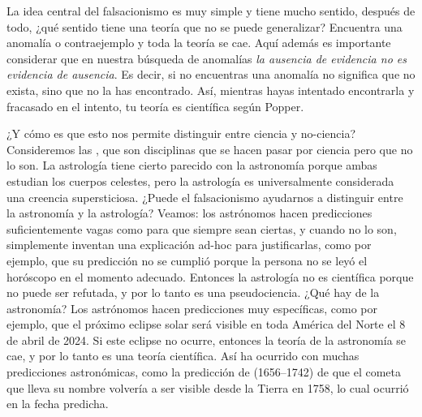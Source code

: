 La idea central del falsacionismo es muy simple y tiene mucho sentido,
después de todo, ¿qué sentido tiene una teoría que no se puede generalizar?
Encuentra una anomalía o contraejemplo y toda la teoría se cae.
Aquí además es importante considerar que en nuestra búsqueda de anomalías
\emph{la ausencia de evidencia no es evidencia de ausencia}.
Es decir, si no encuentras una anomalía no significa que no exista, sino que
no la has encontrado.
Así, mientras hayas intentado encontrarla y fracasado en el intento, tu teoría
es científica según Popper.

¿Y cómo es que esto nos permite distinguir entre ciencia y no-ciencia?
Consideremos las , que son
disciplinas que se hacen pasar por ciencia pero que no lo son.
La astrología tiene cierto parecido con la astronomía porque ambas estudian los
cuerpos celestes, pero la astrología es universalmente considerada una creencia
supersticiosa.
¿Puede el falsacionismo ayudarnos a distinguir entre la astronomía y la
astrología?
Veamos: los astrónomos hacen predicciones suficientemente vagas como para que
siempre sean ciertas, y cuando no lo son, simplemente inventan una explicación
ad-hoc para justificarlas, como por ejemplo, que su predicción no se cumplió
porque la persona no se leyó el horóscopo en el momento adecuado.
Entonces la astrología no es científica porque no puede ser refutada, y por lo
tanto es una pseudociencia.
¿Qué hay de la astronomía?
Los astrónomos hacen predicciones muy específicas, como por ejemplo, que el
próximo eclipse solar será visible en toda América del Norte el 8 de abril de
2024.
Si este eclipse no ocurre, entonces la teoría de la astronomía se cae, y por lo
tanto es una teoría científica.
Así ha ocurrido con muchas predicciones astronómicas, como la predicción de
 (1656--1742) de que el cometa que lleva su
nombre volvería a ser visible desde la Tierra en 1758, lo cual ocurrió en la
fecha predicha.

